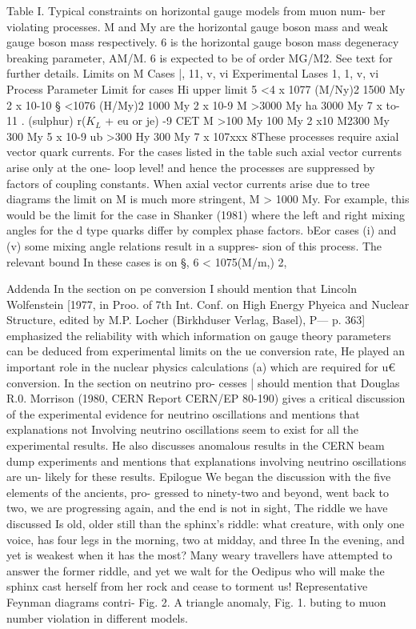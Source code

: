 \documentclass[twoside]{article}
\begin{document}
{{{{{{{{{{{{{{{{Table I. Typical constraints on horizontal gauge models from muon num-
ber violating processes. M and My are the horizontal gauge boson mass
and weak gauge boson mass respectively. 6 is the horizontal gauge
boson mass degeneracy breaking parameter, AM/M. 6 is expected to be of
order MG/M2. See text for further details.
Limits on M
Cases |, 11, v, vi Experimental
Lases 1, 1, v, vi
Process Parameter Limit for cases Hi upper limit
5 <4 x 1077 (M/Ny)2 1500 My 2 x 10-10
§  <1076 (H/My)2 1000 My 2 x 10-9
M >3000 My ha 3000 My 7 x to-11
. (sulphur)
r($K_L$ + eu or je)
-9
CET M >100 My 100 My 2 x10
M2300 My 300 My 5 x 10-9
ub >300 Hy 300 My 7 x 107xxx
8These processes require axial vector quark currents. For the cases
listed in the table such axial vector currents arise only at the one-
loop level! and hence the processes are suppressed by factors of coupling
constants. When axial vector currents arise due to tree diagrams the
limit on M is much more stringent, M > 1000 My. For example, this
would be the limit for the case in Shanker (1981) where the left and
right mixing angles for the d type quarks differ by complex phase
factors.
bEor cases (i) and (v) some mixing angle relations result in a suppres-
sion of this process. The relevant bound In these cases is on §,
6 < 1075(M/m,) 2,

Addenda
In the section on pe conversion I should mention that Lincoln
Wolfenstein [1977, in Proo. of 7th Int. Conf. on High Energy Phyeica and
Nuclear Structure, edited by M.P. Locher (Birkhduser Verlag, Basel), P—
p. 363] emphasized the reliability with which information on gauge theory
parameters can be deduced from experimental limits on the ue conversion
rate, He played an important role in the nuclear physics calculations
(a)
which are required for u€ conversion. In the section on neutrino pro-
cesses | should mention that Douglas R.0. Morrison (1980, CERN Report
CERN/EP 80-190) gives a critical discussion of the experimental evidence
for neutrino oscillations and mentions that explanations not Involving
neutrino oscillations seem to exist for all the experimental results.
He also discusses anomalous results in the CERN beam dump experiments
and mentions that explanations involving neutrino oscillations are un-
likely for these results.
Epilogue
We began the discussion with the five elements of the ancients, pro-
gressed to ninety-two and beyond, went back to two, we are progressing
again, and the end is not in sight, The riddle we have discussed Is old,
older still than the sphinx's riddle: what creature, with only one voice,
has four legs in the morning, two at midday, and three In the evening,
and yet is weakest when it has the most? Many weary travellers have
attempted to answer the former riddle, and yet we walt for the Oedipus
who will make the sphinx cast herself from her rock and cease to
torment us!
Representative Feynman diagrams contri-
Fig. 2.
A triangle anomaly,
Fig. 1.
buting to muon number violation in different models.




}}}}}}}}}}}}}}}}
\end{document}
